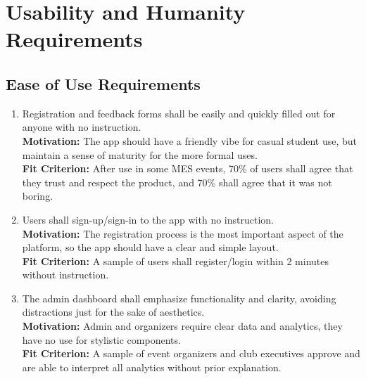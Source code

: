 \documentclass[12pt]{article}
\begin{document}
\section{Usability and Humanity Requirements}
\subsection{Ease of Use Requirements}
\begin{enumerate}[label=UHR-EoU.\arabic*, wide=0pt, leftmargin=*]
  \item Registration and feedback forms shall be easily and quickly filled out for anyone with no instruction.\\[2mm]
    {\bf Motivation:} The app should have a friendly vibe for casual student use, but maintain a sense of maturity for the more formal uses.\\
    {\bf Fit Criterion:} After use in some MES events, 70\% of users shall agree that they trust and respect the product, and 70\% shall agree that it was not boring.
  \item Users shall sign-up/sign-in to the app with no instruction. \\[2mm]
    {\bf Motivation:} The registration process is the most important aspect of the platform, so the app should have a clear and simple layout.\\
    {\bf Fit Criterion:} A sample of users shall register/login within 2 minutes without instruction.
  \item The admin dashboard shall emphasize functionality and clarity, avoiding distractions just for the sake of aesthetics.\\[2mm]
    {\bf Motivation:} Admin and organizers require clear data and analytics, they have no use for stylistic components.\\
    {\bf Fit Criterion:} A sample of event organizers and club executives approve and are able to interpret all analytics without prior explanation.
\end{enumerate}
\end{document}
